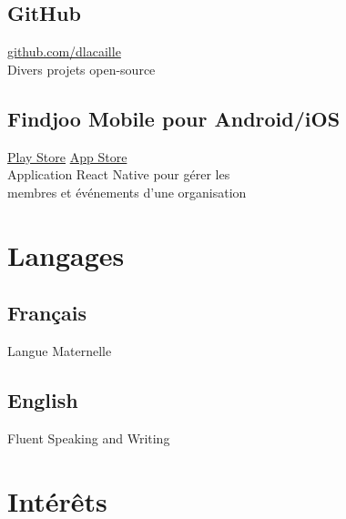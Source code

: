 \documentclass{article}
\begin{document}
\begin{paracol}{2}
\begin{leftcolumn}
    \subsection{GitHub}
    \href{https://github.com/dlacaille}{\faGithub\hspace{0.5em}github.com/dlacaille}\\
    Divers projets open-source

    \vspace{0.5em}

    \subsection{Findjoo Mobile pour Android/iOS}
    \href{https://play.google.com/store/apps/details?id=com.findjoomobile}{\faGooglePlay\hspace{0.5em}Play Store}\hspace{1em}
    \href{https://apps.apple.com/us/app/findjoo/id1499583717}{\faAppStore\hspace{0.5em}App Store}\\
    Application React Native pour gérer les \\
    membres et événements d'une organisation

    \section{Langages}

    \subsection{Français}
    Langue Maternelle

    \vspace{0.5em}

    \subsection{English}
    Fluent Speaking and Writing

    \section{Intérêts}


\end{leftcolumn}
\end{paracol}
\end{document}
